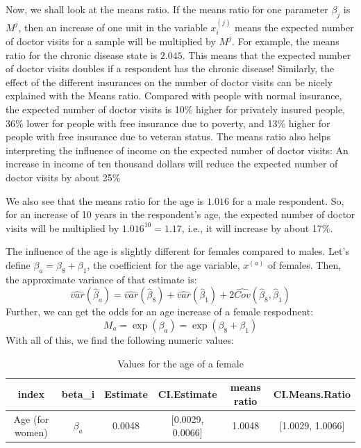 \documentclass[a4paper,11pt]{article}
\begin{document}
Now, we shall look at the means ratio. If the means ratio for one parameter $\beta_j$ is $M^j$, then an increase of one unit in the variable $x_i^{(j)}$ means the expected number of doctor visits for a sample will be multiplied by  $M^j$. For example, the means ratio for the chronic disease state is $2.045$. This means that the expected number of doctor visits doubles if a respondent has the chronic disease! Similarly, the effect of the different insurances on the number of doctor visits can be nicely explained with the Means ratio. Compared with people with normal insurance, the expected number of doctor visits is 10\% higher for privately insured people, 36\% lower for people with free insurance due to poverty, and 13\% higher for people with free insurance due to veteran status. The means ratio also helps interpreting the influence of income on the expected number of doctor visits: An increase in income of ten thousand dollars will reduce the expected number of doctor visits by about 25\%

We also see that the means ratio for the age is $1.016$ for a male respondent. So, for an increase of 10 years in the respondent's age, the expected number of doctor visits will be multiplied by $1.016^{10} = 1.17$, i.e., it will increase by about 17\%. 

The influence of the age is slightly different for females compared to males. Let's define $\beta_a = \beta_8 + \beta_1$, the coefficient for the age variable, $x^{(a)}$ of females. Then, the approximate variance of that estimate is:
\begin{equation}
\widehat{var}(\hat{\beta}_a) = \widehat{var}(\hat{\beta}_8) + \widehat{var}(\hat{\beta}_1) + 2 \widehat{Cov}(\hat{\beta}_8, \hat{\beta}_1)
\end{equation}
Further, we can get the odds for an age increase of a female respodnent:
\begin{equation}
M_a = \exp(\beta_a) = \exp(\beta_8 + \beta_1)
\end{equation}
With all of this, we find the following numeric values:
\begin{table}[h]
    \centering
    \begin{tabular}{|c|c|c|c|c|c|}
    \hline
         index & beta\_i & Estimate & CI.Estimate & means ratio & CI.Means.Ratio\\
	\midrule
         Age (for women)& $\beta_a $ & 0.0048& [0.0029, 0.0066] & 1.0048 &[1.0029, 1.0066] \\
        \hline
    \end{tabular}
    \caption{Values for the age of a female}
    \label{tab:femal_age}
\end{table}
\end{document}
